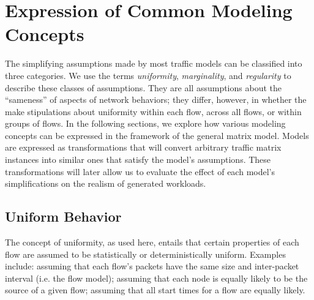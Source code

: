 \documentclass[twocolumn,final]{svjour3}
\newcommand{\caps}[1]{{\smaller{#1}}}
\begin{document}
\section{Expression of Common Modeling Concepts}
\label{sec:modeling-concepts}

The simplifying assumptions made by most traffic models can be classified into three categories. We use the terms \textit{uniformity}, \textit{marginality}, and \textit{regularity} to describe these classes of assumptions. They are all assumptions about the ``sameness'' of aspects of network behaviors; they differ, however, in whether the make stipulations about uniformity within each flow, across all flows, or within groups of flows. In the following sections, we explore how various modeling concepts can be expressed in the framework of the general matrix model. Models are expressed as transformations that will convert arbitrary traffic matrix instances into similar ones that satisfy the model's assumptions. These transformations will later allow us to evaluate the effect of each model's simplifications on the realism of generated workloads.

\subsection{Uniform Behavior}

The concept of uniformity, as used here, entails that certain properties of each flow are assumed to be statistically or deterministically uniform. Examples include: assuming that each flow's packets have the same size and inter-packet interval (i.e. the \caps{CBR} flow model); assuming that each node is equally likely to be the source of a given flow; assuming that all start times for a flow are equally likely.
\end{document}

